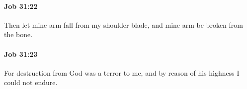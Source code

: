 		\paragraph{Job 31:22} %
			\label{JOB-31-22}

			Then let mine arm fall from my shoulder blade, and mine arm be broken from the bone.


		\paragraph{Job 31:23} %
			\label{JOB-31-23}

			For destruction from God was a terror to me, and by reason of his highness I could not endure.


